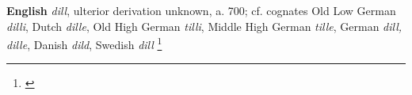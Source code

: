\begin{etymology}\label{ety:dill}
\textbf{English} \textit{dill}, ulterior derivation unknown, a. 700; cf. cognates  Old Low German \textit{dilli}, Dutch \textit{dille}, Old High German \textit{tilli}, Middle High German \textit{tille}, German \textit{dill, dille}, Danish \textit{dild}, Swedish \textit{dill} \footnote{\textcite[s.v. dill]{oed}}
\end{etymology}